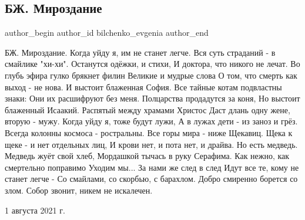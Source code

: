  
 
 
 
 
 
\subsection{БЖ. Мироздание}
\label{sec:02_08_2021.fb.bilchenko_evgenia.1.mirozdanie}
 
\ifcmt
 author_begin
   author_id bilchenko_evgenia
 author_end
\fi

\obeycr
БЖ. Мироздание.
\smallskip
Когда уйду я, им не станет легче.
Вся суть страданий - в смайлике "хи-хи".
Останутся одёжки, и стихи,
И доктора, что никого не лечат.
\smallskip
Во глубь эфира гулко брякнет филин
Великие и мудрые слова
О том, что смерть как выход - не нова.
И выстоит блаженная София.
\smallskip
Все тайные котам подвластны знаки:
Они их расшифруют без меня.
Полцарства продадутся за коня,
Но выстоит блаженный Исаакий.
\smallskip
Распятый между храмами Христос
Даст длань одну жене, вторую - мужу.
Когда уйду я, тоже будут лужи,
А в лужах дети - из заноз и грёз.
\smallskip
Всегда колонны космоса - ростральны.
Все горы мира - ниже Щекавиц.
Щека к щеке - и нет отдельных лиц,
И крови нет, и пота нет, и драйва.
\smallskip
Но есть медведь. Медведь жуёт свой хлеб,
Мордашкой тычась в руку Серафима.
Как нежно, как смертельно поправимо
Уходим мы... За нами же след в след
Идут все те, кому не станет легче -
Со смайлами, со скорбью, с барахлом.
\smallskip
Добро смиренно борется со злом.
Собор звонит, никем не искалечен.
\restorecr

1 августа 2021 г.
